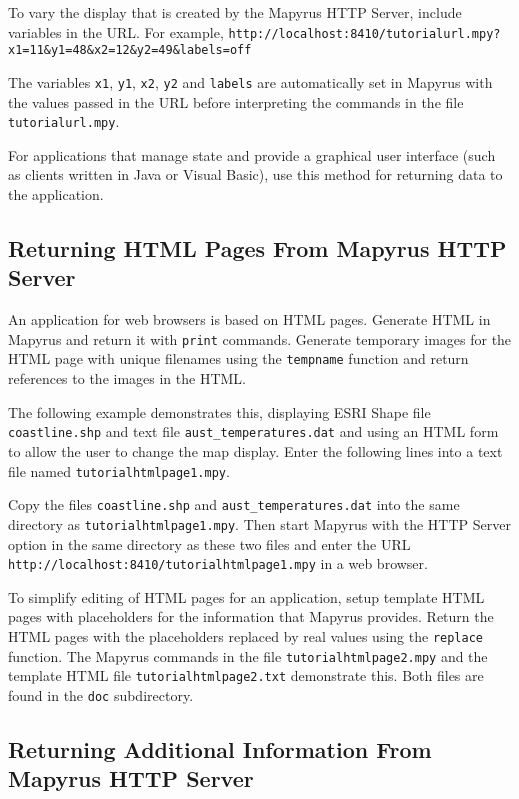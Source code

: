 To vary the display that is created by the Mapyrus HTTP Server, include
variables in the URL.  For example,
\texttt{http://localhost:8410/tutorialurl.mpy?x1=11\&y1=48\&x2=12\&y2=49\&labels=off}

The variables \texttt{x1}, \texttt{y1}, \texttt{x2}, \texttt{y2}
and \texttt{labels} are automatically set in Mapyrus with the values
passed in the URL before interpreting
the commands in the file \texttt{tutorialurl.mpy}.

For applications that manage state
and provide a graphical user interface (such as clients written in
Java or Visual Basic), use this method for returning data to the
application.

\subsection{Returning HTML Pages From Mapyrus HTTP Server}

An application for web browsers is based on HTML pages.
Generate HTML in Mapyrus and return it with \texttt{print} commands.
Generate temporary images for the HTML page with
unique filenames using the
\texttt{tempname}
function and return references to the images in the HTML.

The following example demonstrates this, displaying ESRI Shape file
\texttt{coastline.shp}
and text file
\texttt{aust\_temperatures.dat}
and using an HTML form to allow
the user to change the map display.
Enter the following lines into a text file named
\texttt{tutorialhtmlpage1.mpy}.



Copy the files
\texttt{coastline.shp}
and 
\texttt{aust\_temperatures.dat}
into the same directory as \texttt{tutorialhtmlpage1.mpy}.
Then start Mapyrus with the HTTP Server
option in the same directory as these two files
and enter the URL
\texttt{http://localhost:8410/tutorialhtmlpage1.mpy}
in a web browser.

To simplify editing of HTML pages for an application, setup
template HTML pages with placeholders for the information that
Mapyrus provides.  Return the HTML pages with the placeholders
replaced by real values using the
\texttt{replace}
function.  The Mapyrus commands in the file \texttt{tutorialhtmlpage2.mpy}
and the template HTML file \texttt{tutorialhtmlpage2.txt}
demonstrate this.  Both files are found in the
\texttt{doc} subdirectory.

\subsection{Returning Additional Information From Mapyrus HTTP Server}

